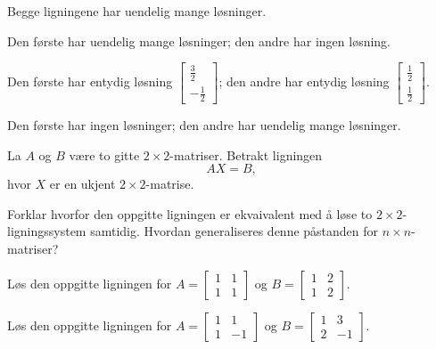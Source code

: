 \begin{losning}

\begin{punkt}
Begge ligningene har uendelig mange løsninger.
\end{punkt}


\begin{punkt}
Den første har uendelig mange løsninger; den andre har ingen løsning.
\end{punkt}

\begin{punkt}
Den første har entydig løsning $\begin{bmatrix} 
\frac{3}{2}\\
-\frac{1}{2}
\end{bmatrix}$; den andre har entydig løsning $\begin{bmatrix} 
\frac{1}{2}\\
\frac{1}{2}
\end{bmatrix}.$

\end{punkt}


\begin{punkt}
Den første har ingen løsninger; den andre har uendelig mange løsninger.
\end{punkt}

\end{losning}






\begin{oppgave}
La $A$ og $B$ være to gitte $2\times 2$-matriser. Betrakt ligningen $$AX=B,$$ hvor $X$ er en ukjent $2\times 2$-matrise.

\begin{punkt}
Forklar hvorfor den oppgitte ligningen er ekvaivalent med å løse to $2\times 2$-ligningssystem samtidig. Hvordan generaliseres denne påstanden for $n\times n$-matriser?
\end{punkt}

\begin{punkt}
Løs den oppgitte ligningen for $A=\begin{bmatrix}
1 & 1\\
1 & 1
\end{bmatrix}
$ og $B=\begin{bmatrix}
1 & 2\\
1 & 2
\end{bmatrix}.$
\end{punkt}

\begin{punkt}
Løs den oppgitte ligningen for $A=\begin{bmatrix}
1 & 1\\
1 & -1
\end{bmatrix}
$ og $B=\begin{bmatrix}
1 & 3\\
2 & -1
\end{bmatrix}.$
\end{punkt}

\end{oppgave}


